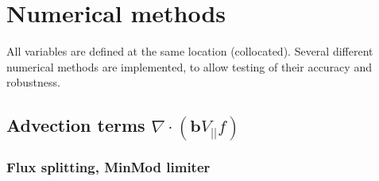 \documentclass[12pt,a4paper]{article}
\begin{document}
\section{Numerical methods}

All variables are defined at the same location (collocated).
Several different numerical methods are implemented, to allow testing of their accuracy and robustness.

\subsection{Advection terms $\nabla\cdot\left(\mathbf{b}V_{||}f\right)$}

\subsubsection{Flux splitting, MinMod limiter}
\label{sec:fluxsplit}
\end{document}
